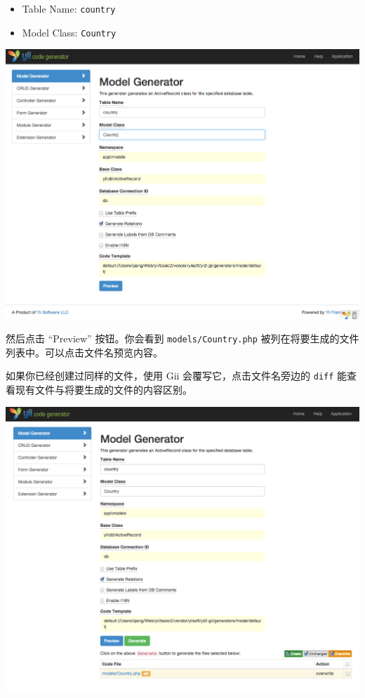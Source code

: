 \begin{itemize}
\item Table Name: \lstinline|country|
\item Model Class: \lstinline|Country|
\end{itemize}
\noindent\includegraphics[width=\textwidth]{images/start-gii-model.png}

然后点击 “Preview” 按钮。你会看到 \lstinline|models/Country.php| 被列在将要生成的文件列表中。可以点击文件名预览内容。

如果你已经创建过同样的文件，使用 Gii 会覆写它，点击文件名旁边的 \lstinline|diff| 能查看现有文件与将要生成的文件的内容区别。

\noindent\includegraphics[width=\textwidth]{images/start-gii-model-preview.png}


